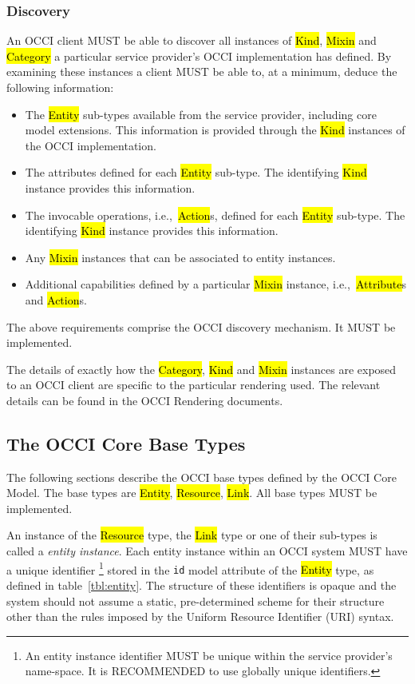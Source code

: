 \documentclass[10pt,a4paper]{article}
\begin{document}
\subsubsection{Discovery}
\label{sec:discovery}
An OCCI client MUST be able to discover all instances of \hl{Kind},
\hl{Mixin} and \hl{Category} a particular service provider's OCCI
implementation has defined. By examining these instances a client MUST
be able to, at a minimum, deduce the following information:
%
\begin{itemize}
  \item The \hl{Entity} sub-types available from the service provider,
    including core model extensions. This information is provided
    through the \hl{Kind} instances of the OCCI implementation.
  \item The attributes defined for each \hl{Entity} sub-type. The
    identifying \hl{Kind} instance provides this information.
  \item The invocable operations, i.e.,~\hl{Action}s, defined for each
    \hl{Entity} sub-type. The identifying \hl{Kind} instance provides
    this information.
  \item Any \hl{Mixin} instances that can be associated to entity
    instances.
  \item Additional capabilities defined by a particular \hl{Mixin}
    instance, i.e.,~\hl{Attribute}s and \hl{Action}s.
\end{itemize}
%
The above requirements comprise the OCCI discovery mechanism. It MUST
be implemented.

The details of exactly how the \hl{Category}, \hl{Kind} and \hl{Mixin}
instances are exposed to an OCCI client are specific to the particular
rendering used.
The relevant details can be found in the OCCI Rendering documents.

\subsection{The OCCI Core Base Types}
\label{sec:base_types}
The following sections describe the OCCI base types defined by the
OCCI Core Model.  The base types are \hl{Entity}, \hl{Resource},
\hl{Link}. All base types MUST be implemented.

An instance of the \hl{Resource} type, the \hl{Link} type or one of their
sub-types is called a {\em entity instance}.
Each entity instance within an OCCI system MUST have a unique identifier%
\footnote{An entity instance identifier MUST be unique within the service
provider's name-space. It is RECOMMENDED to use globally unique identifiers.}
stored in the {\tt id} model attribute of the \hl{Entity} type, as defined in
table~\ref{tbl:entity}.
%
The structure of these identifiers is opaque and the system should not assume a
static, pre-determined scheme for their structure other than the rules imposed
by the Uniform Resource Identifier (URI) \cite{rfc3986} syntax.
\end{document}
